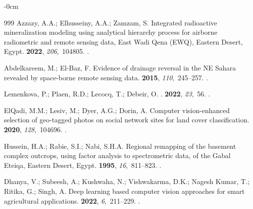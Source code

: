 \documentclass[information,article,accept,pdftex,moreauthors]{Definitions/mdpi}
\begin{document}
\begin{adjustwidth}{-\extralength}{0cm}
\begin{thebibliography}{999}
Azzazy, A.A.; Elhusseiny, A.A.; Zamzam, S.
\newblock Integrated radioactive mineralization modeling using analytical
  hierarchy process for airborne radiometric and remote sensing data, East Wadi
  Qena (EWQ), Eastern Desert, Egypt.
 {\bf 2022}, {\em 206},~104805.
.

Abdelkareem, M.; El-Baz, F.
\newblock Evidence of drainage reversal in the NE Sahara revealed by
  space-borne remote sensing data.
 {\bf 2015}, {\em
  110},~245--257.
.

Lemenkova, P.; Plaen, R.D.; Lecocq, T.; Debeir, O.
.
 {\bf 2022}, {\em 23},~56.
.

ElQadi, M.M.; Lesiv, M.; Dyer, A.G.; Dorin, A.
\newblock Computer vision-enhanced selection of geo-tagged photos on social
  network sites for land cover classification.
 {\bf 2020}, {\em
  128},~104696.
.

Hussein, H.A.; Rabie, S.I.; Nabi, S.H.A.
\newblock Regional remapping of the basement complex outcrops, using factor
  analysis to spectrometric data, of the Gabal Eteiqa, Eastern Desert, Egypt.
 {\bf 1995}, {\em
  16},~811--823.
.

Dhanya, V.; Subeesh, A.; Kushwaha, N.; Vishwakarma, D.K.; {Nagesh Kumar}, T.;
  Ritika, G.; Singh, A.
\newblock Deep learning based computer vision approaches for smart agricultural
  applications.
 {\bf 2022}, {\em
  6},~211--229.
.


\end{thebibliography}
\end{adjustwidth}
\end{document}
